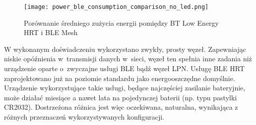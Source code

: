 \begin{figure}[!ht]
	\centering \texttt{[image: power\_ble\_consumption\_comparison\_no\_led.png]} 
	\caption{Porównanie średniego zużycia energii pomiędzy BT Low Energy HRT i BLE Mesh}
	\label{rys:power_ble_consumption_comparison}
\end{figure}

W wykonanym doświadczeniu wykorzystano zwykły, prosty węzeł. Zapewniając niskie opóźnienia w~transmisji danych w~sieci, węzeł ten
spełnia inne zadania niż urządzenie oparte o~zwyczajne usługi BLE bądź węzeł LPN. Usługę BLE HRT zaprojektowano już na poziomie standardu
jako energooszczędne domyślnie. Urządzenie wykorzystujące takie usługi, będące najczęściej zasilanie bateryjnie, może działać
miesiące a nawet lata na pojedynczej baterii (np. typu pastylki CR2032). Dostrzeżona różnica jest więc oczekiwana, naturalna, wynikająca
z różnych przeznaczeń wykorzystywanych konfiguracji.
